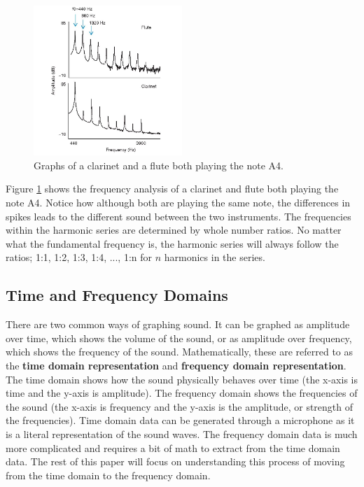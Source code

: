 \documentclass[10pt]{article}
\begin{document}
\begin{figure}[H]
    \centering
    \includegraphics[width=0.5\textwidth]{FluteClarinetFrequencySpectrum.jpg}
    \caption{Graphs of a clarinet and a flute both playing the note A4.} 
    \label{fig:clarinet vs. flute}
\end{figure}

Figure \ref{fig:clarinet vs. flute} shows the frequency analysis of a clarinet and flute both playing the note A4. Notice how although both are playing the same note, the differences in spikes leads to the different sound between the two instruments. The frequencies within the harmonic series are determined by whole number ratios. No matter what the fundamental frequency is, the harmonic series will always follow the ratios; 1:1, 1:2, 1:3, 1:4, ..., 1:n for $n$ harmonics in the series.


\subsection{Time and Frequency Domains}
\hspace{\parindent} There are two common ways of graphing sound. It can be graphed as amplitude over time, which shows the volume of the sound, or as amplitude over frequency, which shows the frequency of the sound. Mathematically, these are referred to as the \textbf{time domain representation} and \textbf{frequency domain representation}. The time domain shows how the sound physically behaves over time (the x-axis is time and the y-axis is amplitude). The frequency domain shows the frequencies of the sound (the x-axis is frequency and the y-axis is the amplitude, or strength of the frequencies). Time domain data can be generated through a microphone as it is a literal representation of the sound waves. The frequency domain data is much more complicated and requires a bit of math to extract from the time domain data. The rest of this paper will focus on understanding this process of moving from the time domain to the frequency domain.
\end{document}
